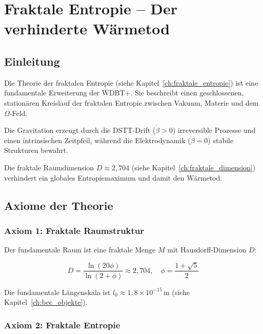 
\chapter{Fraktale Entropie – Der verhinderte Wärmetod}
\label{app:fraktale_entropie}

\section{Einleitung}
\label{app:fraktale_entropie_einleitung}

Die Theorie der fraktalen Entropie (siehe Kapitel~\ref{ch:fraktale_entropie}) ist eine fundamentale Erweiterung 
der WDBT+. Sie beschreibt einen geschlossenen, stationären Kreislauf der fraktalen 
Entropie zwischen Vakuum, Materie und dem $\Omega$-Feld.

Die Gravitation erzeugt durch die DSTT-Drift ($\dot{\beta} > 0$) irreversible Prozesse 
und einen intrinsischen Zeitpfeil, während die Elektrodynamik ($\dot{\beta} = 0$) 
stabile Strukturen bewahrt.

Die fraktale Raumdimension $D \approx 2,704$ (siehe Kapitel~\ref{ch:fraktale_dimension}) verhindert ein globales Entropiemaximum 
und damit den Wärmetod.

\section{Axiome der Theorie}
\label{app:fraktale_entropie_axiome}

\subsection{Axiom 1: Fraktale Raumstruktur}
\label{sub:fraktale_entropie_axiom1}

Der fundamentale Raum ist eine fraktale Menge $M$ mit Hausdorff-Dimension $D$:

\[
D = \frac{\ln(20\phi)}{\ln(2 + \phi)} \approx 2,704, \quad \phi = \frac{1 + \sqrt{5}}{2} \tag{L.1}
\]

Die fundamentale Längenskala ist $l_0 \approx 1,8 \times 10^{-15}\,\text{m}$ (siehe Kapitel~\ref{ch:bec_objekte}).

\subsection{Axiom 2: Fraktale Entropie}
\label{sub:fraktale_entropie_axiom2}

